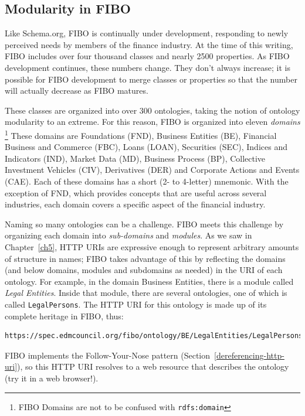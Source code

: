 \subsection{Modularity in FIBO}

Like Schema.org, FIBO is continually under development, responding to newly perceived needs by members of the 
finance industry.  At the time of this writing, FIBO includes over four thousand classes and nearly 2500 properties. As 
FIBO development continues, these numbers change. They don't always increase; it is possible for FIBO development to 
merge classes or properties so that the number will actually decrease as FIBO matures. 

These classes are organized into over 300 ontologies, taking the notion of ontology modularity to an extreme.  
For this reason, FIBO is organized into eleven \emph{domains} \footnote{FIBO Domains are not to be confused with \texttt{rdfs:domain}}
These domains are Foundations (FND), Business Entities (BE), Financial Business and Commerce (FBC), Loans (LOAN), Securities (SEC), 
Indices and Indicators (IND), Market Data (MD), Business Process (BP), Collective Investment Vehicles (CIV), Derivatives (DER) and 
Corporate Actions and Events (CAE).   Each of these domains has a short (2- to 4-letter) mnemonic.   With the exception of FND, which provides concepts that are useful across several industries, each domain covers a specific aspect of the
financial industry.

Naming so many ontologies can be a challenge.  FIBO meets this challenge by organizing each domain 
into \emph{sub-domains} and \emph{modules}. 
As we saw in Chapter~\ref{ch5}, HTTP URIs are expressive enough to represent arbitrary amounts of structure in names; 
FIBO takes advantage of this by reflecting the domains (and below domains, modules  and subdomains as needed) in the URI 
of each ontology.  For example, in the domain Business Entities, there is a module called \emph{Legal Entities}.  Inside that 
module, there are several ontologies, one of which is called \texttt{LegalPersons}.  The HTTP URI for this ontology
is made up of its complete heritage in FIBO, thus:

\begin{lstlisting}
https://spec.edmcouncil.org/fibo/ontology/BE/LegalEntities/LegalPersons/
\end{lstlisting}

FIBO implements the Follow-Your-Nose pattern (Section~\ref{dereferencing-http-uri}), so this HTTP URI resolves to 
a web resource that describes the ontology (try it in a web browser!). 

